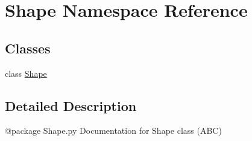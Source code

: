 \hypertarget{namespaceShape}{\section{Shape Namespace Reference}
\label{namespaceShape}
}
\subsection*{Classes}
\begin{DoxyCompactItemize}
\item 
class \hyperlink{classShape_1_1Shape}{Shape}
\end{DoxyCompactItemize}


\subsection{Detailed Description}
\begin{DoxyVerb}@package Shape.py
Documentation for Shape class (ABC)
\end{DoxyVerb}
 